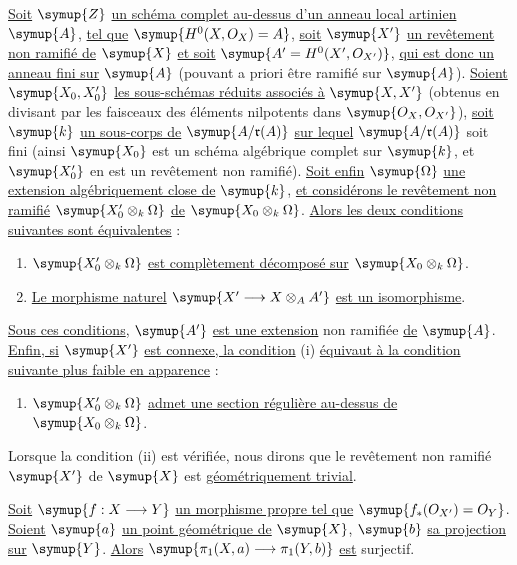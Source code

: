  \uline{Soit} $\symup{Z}$ \uline{un schéma complet au-dessus d'un anneau local
artinien} $\symup{A}$, \uline{tel que} $\symup{H^0(X,O_X)=A}$, \uline{soit} $\symup{X'}$ \uline{un revêtement non ramifié de}
$\symup{X}$ \uline{et soit} $\symup{A'=H^0(X',O_{X'})}$, \uline{qui est donc un anneau fini sur} $\symup{A}$
(pouvant a priori être ramifié sur $\symup{A}$). \uline{Soient} $\symup{X_0,X'_0}$ \uline{les
sous-schémas réduits associés à} $\symup{X,X'}$ (obtenus en divisant par les faisceaux
des éléments nilpotents dans $\symup{O_X,O_{X'}}$), \uline{soit} $\symup{k}$ \uline{un sous-corps de}
$\symup{A/\mathfrak r(A)}$ \uline{sur lequel} $\symup{A/\mathfrak r(A)}$ soit fini (ainsi $\symup{X_0}$ est un
schéma algébrique complet sur $\symup{k}$, et $\symup{X'_0}$ en est un revêtement non ramifié).
\uline{Soit enfin} $\symup{\Omega}$ \uline{une extension algébriquement close de} $\symup{k}$, \uline{et considérons
le revêtement non ramifié} $\symup{X'_0\otimes_k\Omega}$ \uline{de}
$\symup{X_0\otimes_k\Omega}$. \uline{Alors les deux conditions suivantes sont équivalentes} :
\begin{enumerate}
  \item[i.] $\symup{X'_0\otimes_k\Omega}$ \uline{est complètement décomposé sur}
    $\symup{X_0\otimes_k\Omega}$.
  \item[ii.] \uline{Le morphisme naturel}
    $\symup{X'\longrightarrow X\otimes_A A'}$ \uline{est un isomorphisme}.
\end{enumerate}
\uline{Sous ces conditions}, $\symup{A'}$ \uline{est une extension} non ramifiée \uline{de} $\symup{A}$. \uline{Enfin, si}
$\symup{X'}$ \uline{est connexe, la condition} (i) \uline{équivaut à la condition suivante
plus faible en apparence} :
\begin{enumerate}
  \item[i. bis] $\symup{X'_0\otimes_k\Omega}$ \uline{admet une section régulière
    au-dessus de} $\symup{X_0\otimes_k\Omega}$.
\end{enumerate}
Lorsque la condition (ii) est vérifiée, nous dirons que le revêtement
non ramifié $\symup{X'}$ de $\symup{X}$ est \uline{géométriquement trivial}.

 \uline{Soit} $\symup{f:X\longrightarrow Y}$ \uline{un morphisme propre tel que}
$\symup{f_*(O_{X'})=O_Y}$. \uline{Soient} $\symup{a}$ \uline{un point géométrique de} $\symup{X}$, $\symup{b}$ \uline{sa
projection sur} $\symup{Y}$. \uline{Alors}
$\symup{\pi_1(X,a)\longrightarrow\pi_1(Y,b)}$ \uline{est} surjectif.

